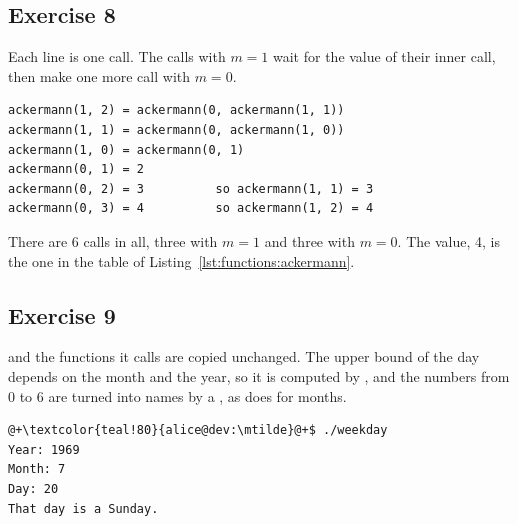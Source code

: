 \subsection*{Exercise 8}

Each line is one call. The calls with $m = 1$ wait for the value of their inner
call, then make one more call with $m = 0$.

\begin{lstlisting}[style=bashVerb]
ackermann(1, 2) = ackermann(0, ackermann(1, 1))
ackermann(1, 1) = ackermann(0, ackermann(1, 0))
ackermann(1, 0) = ackermann(0, 1)
ackermann(0, 1) = 2
ackermann(0, 2) = 3          so ackermann(1, 1) = 3
ackermann(0, 3) = 4          so ackermann(1, 2) = 4
\end{lstlisting}

There are 6 calls in all, three with $m = 1$ and three with $m = 0$. The value,
4, is the one in the table of Listing~\ref{lst:functions:ackermann}.

\subsection*{Exercise 9}

 and the functions it calls are copied unchanged. The upper bound
of the day depends on the month and the year, so it is computed by
, and the numbers from 0 to 6 are turned into names by a
, as  does for months.


\vspace{-10pt}%
\begin{lstlisting}[style=bashVerb, escapechar=@+]
@+\textcolor{teal!80}{alice@dev:\mtilde}@+$ ./weekday
Year: 1969
Month: 7
Day: 20
That day is a Sunday.
\end{lstlisting}
